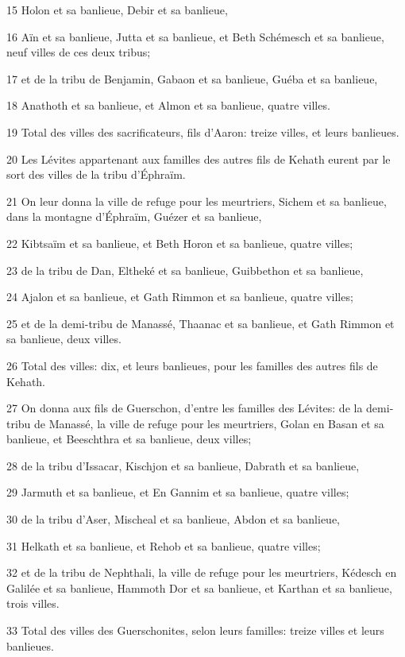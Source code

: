 \par 15 Holon et sa banlieue, Debir et sa banlieue,
\par 16 Aïn et sa banlieue, Jutta et sa banlieue, et Beth Schémesch et sa banlieue, neuf villes de ces deux tribus;
\par 17 et de la tribu de Benjamin, Gabaon et sa banlieue, Guéba et sa banlieue,
\par 18 Anathoth et sa banlieue, et Almon et sa banlieue, quatre villes.
\par 19 Total des villes des sacrificateurs, fils d'Aaron: treize villes, et leurs banlieues.
\par 20 Les Lévites appartenant aux familles des autres fils de Kehath eurent par le sort des villes de la tribu d'Éphraïm.
\par 21 On leur donna la ville de refuge pour les meurtriers, Sichem et sa banlieue, dans la montagne d'Éphraïm, Guézer et sa banlieue,
\par 22 Kibtsaïm et sa banlieue, et Beth Horon et sa banlieue, quatre villes;
\par 23 de la tribu de Dan, Eltheké et sa banlieue, Guibbethon et sa banlieue,
\par 24 Ajalon et sa banlieue, et Gath Rimmon et sa banlieue, quatre villes;
\par 25 et de la demi-tribu de Manassé, Thaanac et sa banlieue, et Gath Rimmon et sa banlieue, deux villes.
\par 26 Total des villes: dix, et leurs banlieues, pour les familles des autres fils de Kehath.
\par 27 On donna aux fils de Guerschon, d'entre les familles des Lévites: de la demi-tribu de Manassé, la ville de refuge pour les meurtriers, Golan en Basan et sa banlieue, et Beeschthra et sa banlieue, deux villes;
\par 28 de la tribu d'Issacar, Kischjon et sa banlieue, Dabrath et sa banlieue,
\par 29 Jarmuth et sa banlieue, et En Gannim et sa banlieue, quatre villes;
\par 30 de la tribu d'Aser, Mischeal et sa banlieue, Abdon et sa banlieue,
\par 31 Helkath et sa banlieue, et Rehob et sa banlieue, quatre villes;
\par 32 et de la tribu de Nephthali, la ville de refuge pour les meurtriers, Kédesch en Galilée et sa banlieue, Hammoth Dor et sa banlieue, et Karthan et sa banlieue, trois villes.
\par 33 Total des villes des Guerschonites, selon leurs familles: treize villes et leurs banlieues.
